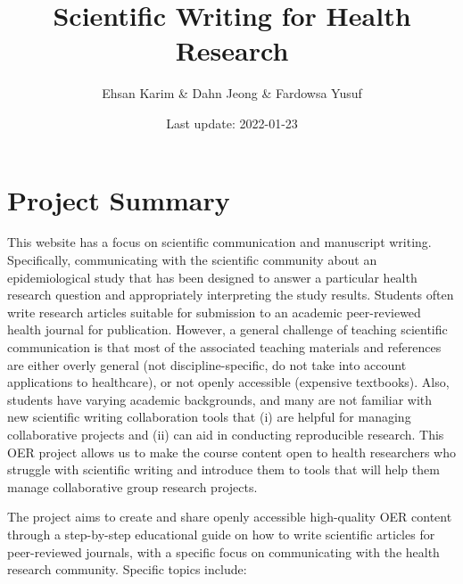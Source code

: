 \documentclass[
]{book}
\title{Scientific Writing for Health Research}
\author{Ehsan Karim \& Dahn Jeong \& Fardowsa Yusuf}
\date{Last update: 2022-01-23}
\begin{document}
\maketitle

{
\setcounter{tocdepth}{1}
\tableofcontents
}
\newenvironment{blackbox}{
  \definecolor{shadecolor}{rgb}{0, 0, 0}  %
  \color{white}
  \begin{shaded}}
 {\end{shaded}}

\hypertarget{project-summary}{%
\chapter*{Project Summary}\label{project-summary}}

This website has a focus on scientific communication and manuscript writing. Specifically, communicating with the scientific community about an epidemiological study that has been designed to answer a particular health research question and appropriately interpreting the study results. Students often write research articles suitable for submission to an academic peer-reviewed health journal for publication. However, a general challenge of teaching scientific communication is that most of the associated teaching materials and references are either overly general (not discipline-specific, do not take into account applications to healthcare), or not openly accessible (expensive textbooks). Also, students have varying academic backgrounds, and many are not familiar with new scientific writing collaboration tools that (i) are helpful for managing collaborative projects and (ii) can aid in conducting reproducible research. This OER project allows us to make the course content open to health researchers who struggle with scientific writing and introduce them to tools that will help them manage collaborative group research projects.

The project aims to create and share openly accessible high-quality OER content through a step-by-step educational guide on how to write scientific articles for peer-reviewed journals, with a specific focus on communicating with the health research community. Specific topics include:
\end{document}
